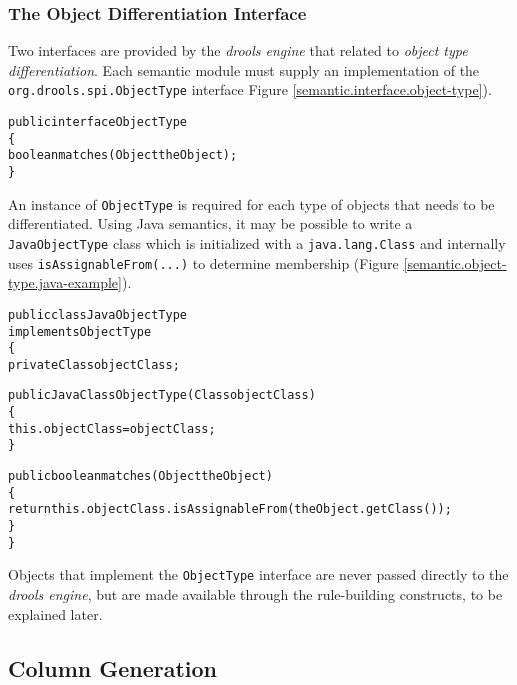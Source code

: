 \documentclass[10pt,twocolumn,letterpaper]{article}
\newenvironment{codelisting}%
	{\begin{minipage}{250pt}\small\begin{alltt}}%
	{\end{alltt}\end{minipage}}
\begin{document}
\subsubsection{The Object Differentiation Interface}

Two interfaces are provided by the \emph{drools engine} that related
to \emph{object type differentiation}.  Each semantic module must 
supply an implementation of the \verb|org.drools.spi.ObjectType| 
interface Figure \ref{semantic.interface.object-type}).

\begin{figure*}[p]
	\begin{codelisting}
	public interface ObjectType
	\{
	     boolean matches(Object theObject);
	\}
	\end{codelisting}
	\caption{The \emph{ObjectType} interface.}
	\label{semantic.interface.object-type}
\end{figure*}

An instance of \verb|ObjectType| is required for each type of objects
that needs to be differentiated.  Using Java semantics, it may be
possible to write a \verb|JavaObjectType| class which is 
initialized with a \verb|java.lang.Class| and internally uses
\verb|isAssignableFrom(...)| to determine membership 
(Figure \ref{semantic.object-type.java-example}).

\begin{figure*}[p]
	\begin{codelisting}
	public class JavaObjectType 
	             implements ObjectType
	\{
	     private Class objectClass;

	     public JavaClassObjectType(Class objectClass)
	     \{
	          this.objectClass = objectClass;
	     \}

	     public boolean matches(Object theObject)
	     \{
	          return this.objectClass.isAssignableFrom( theObject.getClass() );
	     \}
	\}
	\end{codelisting}
	\caption{Example \emph{ObjectType} implementing Java class semantics, including polymorphism.} 
	\label{semantic.object-type.java-example}
\end{figure*}

Objects that implement the \verb|ObjectType| interface are never
passed directly to the \emph{drools engine}, but are made available
through the rule-building constructs, to be explained later.

\subsection{Column Generation}
\end{document}
